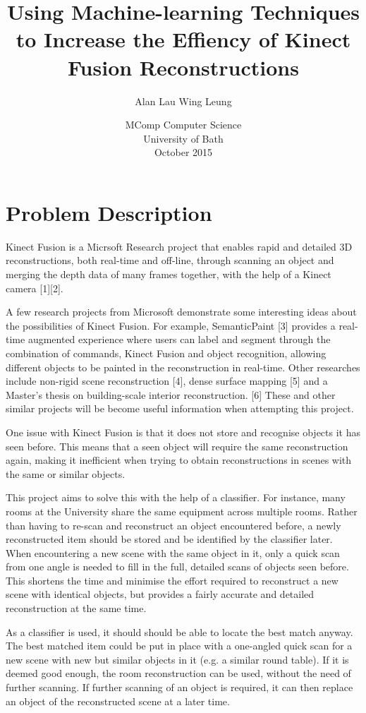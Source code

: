 \documentclass[11pt,openright,a4paper]{report}
\title{Using Machine-learning Techniques to Increase the Effiency of Kinect Fusion Reconstructions}
\author{Alan Lau Wing Leung}
\date{MComp Computer Science\\University of Bath\\October 2015}
\begin{document}
\maketitle
\newpage

\tableofcontents
\newpage

\setcounter{page}{1}

\chapter{Problem Description}
Kinect Fusion is a Micrsoft Research project that enables rapid and detailed 3D reconstructions, both real-time and off-line, through scanning an object and merging the depth data of many frames together, with the help of a Kinect camera [1][2].

A few research projects from Microsoft demonstrate some interesting ideas about the possibilities of Kinect Fusion. For example, SemanticPaint [3] provides a real-time augmented experience where users can label and segment through the combination of commands, Kinect Fusion and object recognition, allowing different objects to be painted in the reconstruction in real-time. Other researches include non-rigid scene reconstruction [4], dense surface mapping [5] and a Master's thesis on building-scale interior reconstruction. [6] These and other similar projects will be become useful information when attempting this project.

One issue with Kinect Fusion is that it does not store and recognise objects it has seen before. This means that a seen object will require the same reconstruction again, making it inefficient when trying to obtain reconstructions in scenes with the same or similar objects.

This project aims to solve this with the help of a classifier. For instance, many rooms at the University share the same equipment across multiple rooms. Rather than having to re-scan and reconstruct an object encountered before, a newly reconstructed item should be stored and be identified by the classifier later. When encountering a new scene with the same object in it, only a quick scan from one angle is needed to fill in the full, detailed scans of objects seen before. This shortens the time and minimise the effort required to reconstruct a new scene with identical objects, but provides a fairly accurate and detailed reconstruction at the same time.

As a classifier is used, it should should be able to locate the best match anyway. The best matched item could be put in place with a one-angled quick scan for a new scene with new but similar objects in it (e.g. a similar round table). If it is deemed good enough, the room reconstruction can be used, without the need of further scanning. If further scanning of an object is required, it can then replace an object of the reconstructed scene at a later time.
\end{document}
